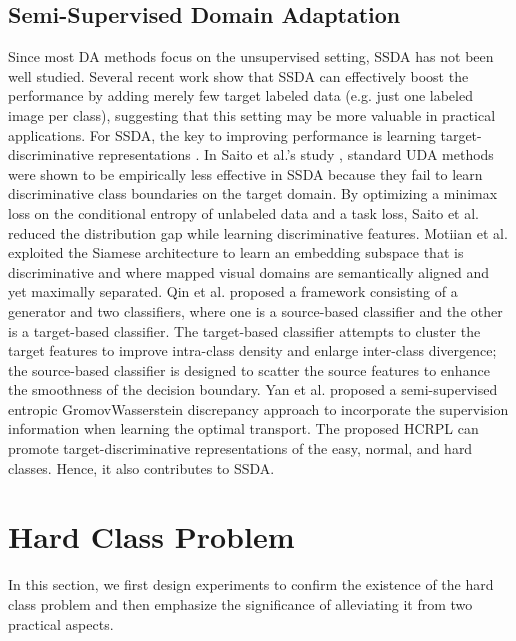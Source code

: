 \documentclass[a4paper,fleqn]{cas-dc}
\begin{document}
	\subsection{Semi-Supervised Domain Adaptation} 
	Since most DA methods focus on the unsupervised setting, SSDA has not been well studied. 	{ Several recent work \cite{Qin2020OppositeSL,Yang2020DeepCW,Li2019SemiSupervisedDA,Kim2020AttractPA,saito2019semi} show that SSDA can effectively boost the performance by adding merely few target labeled data (e.g. just one labeled image per class), suggesting that this setting may be more valuable in practical applications. For SSDA, the key to improving performance is learning target-discriminative representations \cite{saito2019semi}.} In Saito et al.'s study \cite{saito2019semi}, standard UDA methods \cite{ganin2014unsupervised,long2018conditional,saito2017adversarial} were shown to be empirically less effective in SSDA because they fail to learn discriminative class boundaries on the target domain. By optimizing a minimax loss on the conditional entropy of unlabeled data and a task loss, Saito et al. \cite{saito2019semi} reduced the distribution gap while learning discriminative features. Motiian et al. \cite{motiian2017unified}  exploited the Siamese architecture to learn an embedding subspace that is discriminative and where mapped visual domains are semantically aligned and yet maximally separated. Qin et al. \cite{qin2020opposite} proposed a framework consisting of a generator and two classifiers, where one is a source-based classifier and the other is a target-based classifier. The target-based classifier attempts to cluster the target features to improve intra-class density and enlarge inter-class divergence; the source-based classifier is designed to scatter the source features to enhance the smoothness of the decision boundary. Yan et al.\cite{Yan2018SemiSupervisedOT} proposed a semi-supervised entropic GromovWasserstein discrepancy approach to incorporate the supervision information when learning the optimal transport. {The proposed HCRPL can promote target-discriminative representations of the easy, normal, and hard classes. Hence, it also contributes to SSDA.}
	
	
		\section{Hard Class Problem}\label{sec_hard_class}
		In this section, we first design experiments to confirm the existence of the hard class problem and then emphasize the significance of alleviating it from two practical aspects.
	
\end{document}
